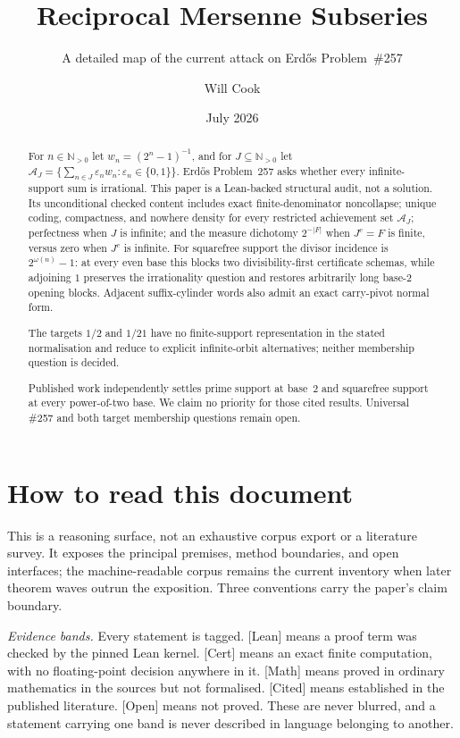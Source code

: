 \documentclass[11pt]{article}
\title{Reciprocal Mersenne Subseries}
\subtitle{A detailed map of the current attack on Erd\H{o}s Problem~\#257}
\author{Will Cook}
\date{July 2026}
\theoremstyle{plain}
\theoremstyle{definition}
\theoremstyle{remark}
\newcommand{\ev}[1]{{\small\textsf{[#1]}}\xspace}
\newcommand{\Npos}{\mathbb{N}_{>0}}
\begin{document}
\maketitle

\paperprovenance

\begin{abstract}
For $n\in\Npos$ let $w_n=(2^n-1)^{-1}$, and for $J\subseteq\Npos$ let
$\mathcal A_J=\{\sum_{n\in J}\varepsilon_nw_n:\varepsilon_n\in\{0,1\}\}$.
Erd\H{o}s Problem~257 asks whether every infinite-support sum is irrational.
This paper is a Lean-backed structural audit, not a solution.  Its
unconditional checked content includes exact finite-denominator
noncollapse; unique coding, compactness, and nowhere density for every
restricted achievement set $\mathcal A_J$; perfectness when $J$ is infinite;
and the measure dichotomy $2^{-|F|}$ when $J^c=F$ is finite, versus zero when
$J^c$ is infinite.  For squarefree support the divisor incidence is
$2^{\omega(n)}-1$: at every even base this blocks two divisibility-first
certificate schemas, while adjoining $1$ preserves the irrationality question
and restores arbitrarily long base-$2$ opening blocks.  Adjacent
suffix-cylinder words also admit an exact carry-pivot normal form.

The
targets $1/2$ and $1/21$ have no finite-support representation in the stated
normalisation and reduce to explicit infinite-orbit alternatives; neither
membership question is decided.

Published work independently settles prime
support at base~$2$ and squarefree support at every power-of-two base.  We
claim no priority for those cited results.  Universal \#257 and both target
membership questions remain open.
\end{abstract}

\section*{How to read this document}

This is a reasoning surface, not an exhaustive corpus export or a literature
survey.  It exposes the principal premises, method boundaries, and open
interfaces; the machine-readable corpus remains the current inventory when
later theorem waves outrun the exposition.  Three conventions carry the
paper's claim boundary.

\emph{Evidence bands.}  Every statement is tagged.  \ev{Lean} means a proof term
was checked by the pinned Lean kernel.  \ev{Cert} means an exact finite
computation, with no floating-point decision anywhere in it.  \ev{Math} means
proved in ordinary mathematics in the sources but not formalised.  \ev{Cited}
means established in the published literature.  \ev{Open} means not proved.
These are never blurred, and a statement carrying one band is never described in
language belonging to another.
\end{document}
